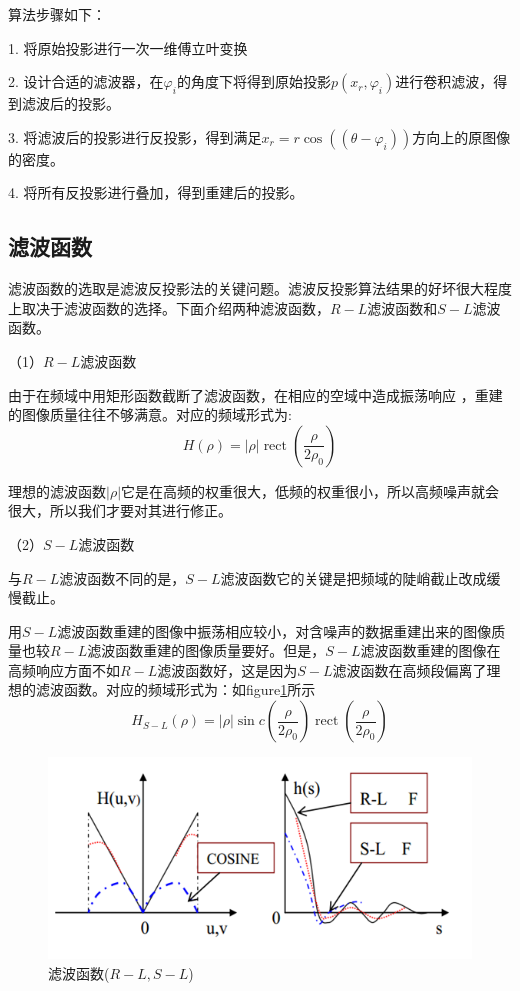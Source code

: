 \documentclass[hyperref]{ctexart}
\begin{document}
				算法步骤如下：

				1. 将原始投影进行一次一维傅立叶变换

				2. 设计合适的滤波器，在$φ_{i}$的角度下将得到原始投影$p(x_{r},φ_{i})$进行卷积滤波，得到滤波后的投影。

				3. 将滤波后的投影进行反投影，得到满足$x_{r}=r \cos ((\theta⁡ - φ_{i}))$方向上的原图像的密度。

				4. 将所有反投影进行叠加，得到重建后的投影。

		\subsection{滤波函数}
			滤波函数的选取是滤波反投影法的关键问题。滤波反投影算法结果的好坏很大程度上取决于滤波函数的选择。下面介绍两种滤波函数，$R-L$滤波函数和$S-L$滤波函数。 

			（1）$R-L$滤波函数

				由于在频域中用矩形函数截断了滤波函数，在相应的空域中造成振荡响应 ，重建的图像质量往往不够满意。对应的频域形式为:
				\begin{equation}	
					H(\rho)=|\rho| \operatorname{rect}\left(\frac{\rho}{2 \rho_{0}}\right)
				\end{equation}

				理想的滤波函数$|\rho|$它是在高频的权重很大，低频的权重很小，所以高频噪声就会很大，所以我们才要对其进行修正。

			（2）$S-L$滤波函数

	      与$R-L$滤波函数不同的是，$S-L$滤波函数它的关键是把频域的陡峭截止改成缓慢截止。

	      用$S-L$滤波函数重建的图像中振荡相应较小，对含噪声的数据重建出来的图像质量也较$R-L$滤波函数重建的图像质量要好。但是，$S-L$滤波函数重建的图像在高频响应方面不如$R-L$滤波函数好，这是因为$S-L$滤波函数在高频段偏离了理想的滤波函数。对应的频域形式为：如figure\ref{滤波函数}所示
			\begin{equation}
				H_{S-L}(\rho)=|\rho| \sin c\left(\frac{\rho}{2 \rho_{0}}\right) \operatorname{rect}\left(\frac{\rho}{2 \rho_{0}}\right)
			\end{equation}
			\begin{figure}[ht!]
				\centering
				\includegraphics[width=120mm]{滤波函数.png}
				\caption{滤波函数($R-L,S-L$) \label{滤波函数}}
			\end{figure}
			
\end{document}
